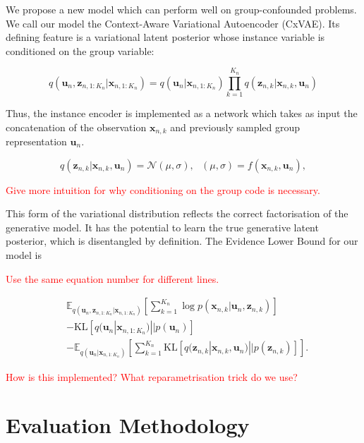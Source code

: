 \documentclass{article} %
\newcommand{\todo}[1]{\textcolor{red}{#1}}
\begin{document}
We propose a new model which can perform well on group-confounded problems. We call our model the Context-Aware Variational Autoencoder (CxVAE). Its defining feature is a variational latent posterior whose instance variable is conditioned on the group variable:

\begin{equation}
q(\mathbf{u}_n, \mathbf{z}_{n, 1:K_n}  | \mathbf{x}_{n, 1:K_n} ) = q(\mathbf{u}_n | \mathbf{x}_{n, 1:K_n} ) \prod_{k=1}^{K_n} q(\mathbf{z}_{n,k} | \mathbf{x}_{n,k},  \mathbf{u}_n)
\end{equation}

Thus, the instance encoder is implemented as a network which takes as input the concatenation of the observation $\mathbf{x}_{n,k}$ and previously sampled group representation $\mathbf{u}_n$.

\begin{equation}
q(\mathbf{z}_{n,k} | \mathbf{x}_{n,k}, \mathbf{u}_n) = \mathcal{N} (\mu, \sigma), ~~~ (\mu, \sigma) = f (\mathbf{x}_{n,k}, \mathbf{u}_n),
\end{equation}

\todo{Give more intuition for why conditioning on the group code is necessary.}

This form of the variational distribution reflects the correct factorisation of the generative model. It has the potential to learn the true generative latent posterior, which is disentangled by definition. The Evidence Lower Bound for our model is

\todo{Use the same equation number for different lines.}

\begin{align}
& \mathbb{E}_{q(\mathbf{u}_n, \mathbf{z}_{n, 1:K_n} | \mathbf{x}_{n, 1:K_n})} \left[\sum_{k=1}^{K_n} \log p(\mathbf{x}_{n,k} | \mathbf{u}_n, \mathbf{z}_{n,k})\right] \\ & - \mathrm{KL} [q(\mathbf{u}_n| \mathbf{x}_{n,1:K_n}) || p(\mathbf{u}_n)] \\ & - \mathbb{E}_{q(\mathbf{u}_n | \mathbf{x}_{n,1:K_n})}\left[\sum_{k=1}^{K_n} \mathrm{KL}[q(\mathbf{z}_{n,k} | \mathbf{x}_{n,k},\mathbf{u}_n) || p(\mathbf{z}_{n,k})]\right].
\end{align}

\todo{How is this implemented? What reparametrisation trick do we use?}

\section{Evaluation Methodology}
\end{document}
